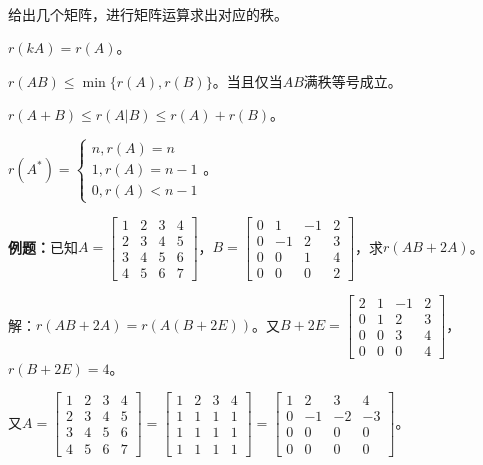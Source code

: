 \paragraph{}

给出几个矩阵，进行矩阵运算求出对应的秩。

$r(kA)=r(A)$。

$r(AB)\leqslant\min\{r(A),r(B)\}$。当且仅当$AB$满秩等号成立。

$r(A+B)\leqslant r(A|B)\leqslant r(A)+r(B)$。

$r(A^*)=\left\{\begin{array}{l}
    n, r(A)=n \\
    1, r(A)=n-1 \\
    0, r(A)<n-1
\end{array}\right.$。

\textbf{例题：}已知$A=\left[\begin{array}{cccc}
    1 & 2 & 3 & 4 \\
    2 & 3 & 4 & 5 \\
    3 & 4 & 5 & 6 \\
    4 & 5 & 6 & 7
\end{array}\right]$，$B=\left[\begin{array}{cccc}
    0 & 1 & -1 & 2 \\
    0 & -1 & 2 & 3 \\
    0 & 0 & 1 & 4 \\
    0 & 0 & 0 & 2
\end{array}\right]$，求$r(AB+2A)$。

解：$r(AB+2A)=r(A(B+2E))$。又$B+2E=\left[\begin{array}{cccc}
    2 & 1 & -1 & 2 \\
    0 & 1 & 2 & 3 \\
    0 & 0 & 3 & 4 \\
    0 & 0 & 0 & 4
\end{array}\right]$，$r(B+2E)=4$。

又$A=\left[\begin{array}{cccc}
    1 & 2 & 3 & 4 \\
    2 & 3 & 4 & 5 \\
    3 & 4 & 5 & 6 \\
    4 & 5 & 6 & 7
\end{array}\right]=\left[\begin{array}{cccc}
    1 & 2 & 3 & 4 \\
    1 & 1 & 1 & 1 \\
    1 & 1 & 1 & 1 \\
    1 & 1 & 1 & 1
\end{array}\right]=\left[\begin{array}{cccc}
    1 & 2 & 3 & 4 \\
    0 & -1 & -2 & -3 \\
    0 & 0 & 0 & 0 \\
    0 & 0 & 0 & 0
\end{array}\right]$。\medskip

